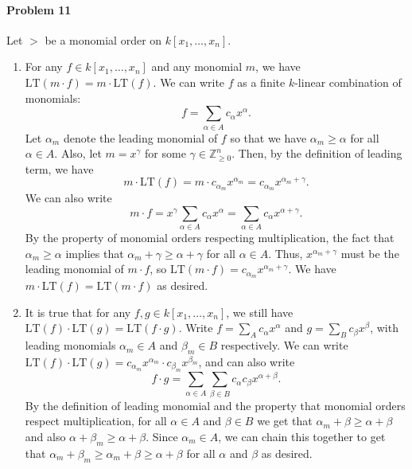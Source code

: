 \documentclass[12pt]{amsart}
\theoremstyle{definition}
\begin{document}
\begin{flushleft}
\paragraph{Problem 11} Let $>$ be a monomial order on $k[x_1,\dots,x_n]$. \begin{enumerate}
    \item[a.] For any $f \in k[x_1,\dots,x_n]$ and any monomial $m$, we have $\text{LT}(m\cdot f) = m\cdot \text{LT}(f)$. We can write $f$ as a finite $k$-linear combination of monomials: \[
    f = \sum_{\alpha \in A} c_\alpha x^\alpha.
    \]
    Let $\alpha_m$ denote the leading monomial of $f$ so that we have $\alpha_m \ge \alpha$ for all $\alpha \in A$. Also, let $m = x^\gamma$ for some $\gamma \in \mathbb Z^n_{\ge 0}$. Then, by the definition of leading term, we have \[m\cdot \text{LT}(f)=m\cdot c_{\alpha_m}x^{\alpha_m} = c_{\alpha_m} x^{\alpha_m+\gamma}.\]
    We can also write \[m \cdot f = x^\gamma \sum_{\alpha \in A} c_\alpha x^\alpha =  \sum_{\alpha \in A} c_\alpha x^{\alpha + \gamma}.\] 
    By the property of monomial orders respecting multiplication, the fact that $\alpha_m \ge \alpha$ implies that $\alpha_m + \gamma \ge \alpha + \gamma$ for all $\alpha \in A$. Thus, $x^{\alpha_m + \gamma}$ must be the leading monomial of $m\cdot f$, so $\text{LT}(m\cdot f) = c_{\alpha_m} x^{\alpha_m + \gamma}$. We have $m \cdot \text{LT}(f) = \text{LT}(m \cdot f)$ as desired.
    \item[b.] It is true that for any $f,g \in k[x_1,\dots,x_n]$, we still have $\text{LT}(f)\cdot \text{LT}(g) = \text{LT}(f\cdot g)$. Write $f = \sum_{A} c_\alpha x^\alpha$ and $g = \sum_B c_\beta x^\beta$, with leading monomials $\alpha_m \in A$ and $\beta_m \in B$ respectively. We can write $\text{LT}(f)\cdot \text{LT}(g) = c_{\alpha_m} x^{\alpha_m} \cdot c_{\beta_m}x^{\beta_m}$, and can also write
    \[
    f \cdot g = \sum_{\alpha \in A} \sum_{\beta \in B} c_\alpha c_\beta x^{\alpha + \beta}.
    \]
    By the definition of leading monomial and the property that monomial orders respect multiplication, for all $\alpha \in A$ and $\beta \in B$ we get that $\alpha_m + \beta \ge \alpha + \beta$ and also $\alpha + \beta_m \ge \alpha + \beta$. Since $\alpha_m \in A$, we can chain this together to get that $\alpha_m + \beta_m \ge \alpha_m + \beta\ge \alpha + \beta$ for all $\alpha$ and $\beta$ as desired.
    

\end{enumerate}
\end{flushleft}
\end{document}
